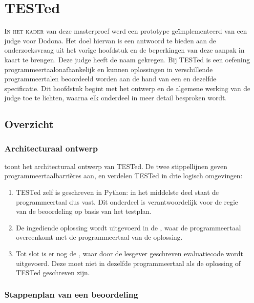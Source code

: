 \chapter{TESTed}\label{ch:de-universele-judge}

\lettrine{I}{n het kader} van deze masterproef werd een prototype geïmplementeerd van een judge voor Dodona.
Het doel hiervan is een antwoord te bieden aan de onderzoeksvraag uit het vorige hoofdstuk en de beperkingen van deze aanpak in kaart te brengen.
Deze judge heeft de naam  gekregen.
Bij TESTed is een oefening programmeertaalonafhankelijk en kunnen oplossingen in verschillende programmeertalen beoordeeld worden aan de hand van een en dezelfde specificatie.
Dit hoofdstuk begint met het ontwerp en de algemene werking van de judge toe te lichten, waarna elk onderdeel in meer detail besproken wordt.

\section{Overzicht}\label{sec:ontwerp}

\subsection{Architecturaal ontwerp}\label{subsec:architecturaal-overzicht}

 toont het architecturaal ontwerp van TESTed.
De twee stippellijnen geven programmeertaalbarrières aan, en verdelen TESTed in drie logisch omgevingen:

\begin{enumerate}
    \item TESTed zelf is geschreven in Python: in het middelste deel staat de programmeertaal dus vast.
    Dit onderdeel is verantwoordelijk voor de regie van de beoordeling op basis van het testplan.
    \item De ingediende oplossing wordt uitgevoerd in de , waar de programmeertaal overeenkomt met de programmeertaal van de oplossing.
    \item Tot slot is er nog de , waar door de lesgever geschreven evaluatiecode wordt uitgevoerd.
    Deze moet niet in dezelfde programmeertaal als de oplossing of TESTed geschreven zijn.
\end{enumerate}

\subsection{Stappenplan van een beoordeling}\label{subsec:stappenplan-van-een-beoordeling}

